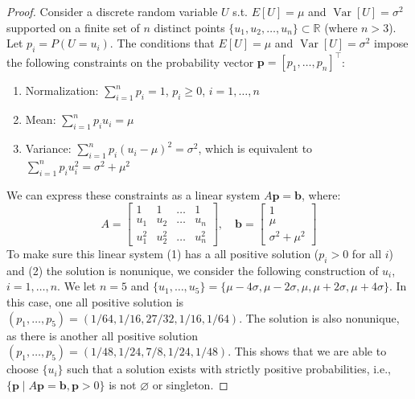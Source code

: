 \documentclass[11pt]{article}
\theoremstyle{referenceplain}
\theoremstyle{referencedefinition}
\theoremstyle{referenceremark}
\begin{document}
\begin{proof}
Consider a discrete random variable $U$  s.t. $E[U] = \mu$ and $\operatorname{Var}[U] = \sigma^2$ supported on a finite set of $n$ distinct points $\{u_1, u_2, \dots, u_n\} \subset \mathbb{R}$ (where $n > 3$). Let $p_i = P(U = u_i)$. The conditions that $E[U] = \mu$ and $\operatorname{Var}[U] = \sigma^2$ impose the following constraints on the probability vector $\mathbf{p} = [p_1, \dots, p_n]^\top$:

\begin{enumerate}
    \item Normalization: $\sum_{i=1}^n p_i = 1$, $p_i\ge0$, $i=1,\dots,n$
    \item Mean: $\sum_{i=1}^n p_i u_i = \mu$
    \item Variance: $\sum_{i=1}^n p_i (u_i - \mu)^2 = \sigma^2$, which is equivalent to $\sum_{i=1}^n p_i u_i^2 = \sigma^2 + \mu^2$
\end{enumerate}
We can express these constraints as a linear system $A\mathbf{p} = \mathbf{b}$, where:
$$
A = \begin{bmatrix}
1 & 1 & \dots & 1 \\
u_1 & u_2 & \dots & u_n \\
u_1^2 & u_2^2 & \dots & u_n^2
\end{bmatrix}, \quad
\mathbf{b} = \begin{bmatrix}
1 \\
\mu \\
\sigma^2 + \mu^2
\end{bmatrix}
$$
To make sure this linear system (1) has a all positive solution ($p_i>0$ for all $i$) and (2) the solution is nonunique, we consider the following construction of $u_i$, $i=1,\dots,n$. We let $n=5$ and $\{u_1,\dots,u_5\} = \{\mu-4\sigma,\mu-2\sigma,\mu,\mu+2\sigma,\mu+4\sigma\}$. In this case, one all positive solution is $(p_1,\dots,p_5) = (1/64,1/16,27/32,1/16,1/64)$. The solution is also nonunique, as there is another all positive solution $(p_1,\dots,p_5) = (1/48,1/24,7/8,1/24,1/48)$. This shows that we are able to choose $\{u_i\}$ such that a solution exists with strictly positive probabilities, i.e., $\{\mathbf{p} \mid A \mathbf{p}=\mathbf{b}, \mathbf{p} > 0\}$ is not $\varnothing$ or singleton.


\end{proof}
\end{document}
